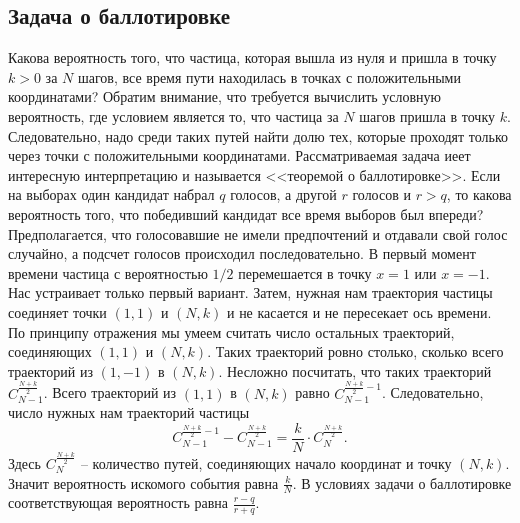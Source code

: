 \subsection{Задача о баллотировке}
Какова вероятность того, что частица, которая вышла из нуля и пришла в точку $k > 0$ за $N$ шагов, все время пути находилась в точках с положительными координатами? Обратим внимание, что требуется вычислить условную вероятность, где условием является то, что частица за $N$ шагов пришла в точку $k$. Следовательно, надо среди таких путей найти долю тех, которые проходят только через точки с положительными координатами.
\newline
Рассматриваемая задача иеет интересную интерпретацию и называется <<теоремой о баллотировке>>. Если на выборах один кандидат набрал $q$ голосов, а другой $r$ голосов и $r > q$, то какова вероятность того, что победивший кандидат все время выборов был впереди? Предполагается, что голосовавшие не имели предпочтений и отдавали свой голос случайно, а подсчет голосов происходил последовательно.
\newline
В первый момент времени частица с вероятностью $1/2$ перемешается в точку $x = 1$ или $x = -1$. Нас устраивает только первый вариант. Затем, нужная нам траектория частицы соединяет точки $(1,1)$ и $(N, k)$ и не касается и не пересекает ось времени. По принципу отражения мы умеем считать число остальных траекторий, соединяющих $(1,1)$ и $(N, k)$. Таких траекторий ровно столько, сколько всего траекторий из $(1, -1)$ в $(N, k)$. Несложно посчитать, что таких траекторий $C_{N-1}^{\frac{N+k}{2}}$. Всего траекторий из $(1,1)$ в $(N, k)$ равно $C_{N-1}^{\frac{N+k}{2} - 1}$. Следовательно, число нужных нам траекторий частицы
\[
    C_{N-1}^{\frac{N+k}{2} - 1} - C_{N-1}^{\frac{N+k}{2}} = \frac{k}{N} \cdot C_{N}^{\frac{N+k}{2}}.
\]
Здесь $C_{N}^{\frac{N+k}{2}}$ -- количество путей, соединяющих начало координат и точку $(N, k)$. Значит вероятность искомого события равна $\frac{k}{N}$. В условиях задачи о баллотировке соответствующая вероятность равна $\frac{r-q}{r+q}$.
\newpage

